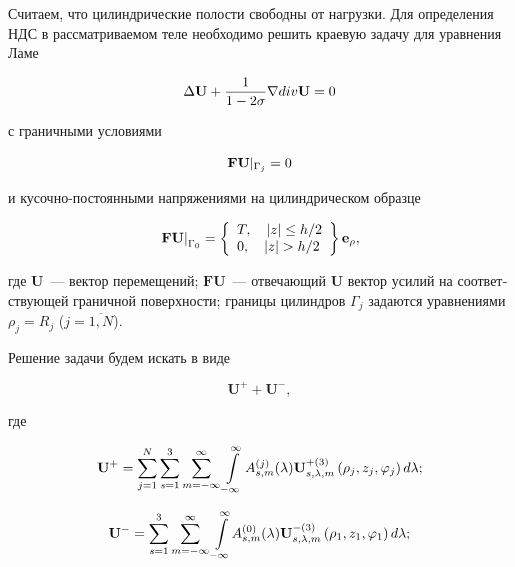 \begin{russian}
Считаем, что цилиндрические полости свободны от нагрузки. Для определения НДС в рассматриваемом теле необходимо решить краевую задачу для уравнения Ламе

\begin{equation}
\Delta {\bf{U}} + \frac{1}{{1 - 2\sigma }}\nabla div{\bf{U}} = 0
\label{eq:7:27}
\end{equation}

\noindent с граничными условиями

\begin{equation}
{\bf{FU}}{|_{{\Gamma _j}}} = 0
\label{eq:7:18}
\end{equation}

\noindent и кусочно-постоянными напряжениями на цилиндрическом образце

\begin{equation}
{\left. {{\bf{FU}}} \right|_{{\Gamma _0}}} = \left\{ \begin{array}{l}
T,\;\;\;{\mkern 1mu} {\kern 1pt} |z| \le h/2\\
0,\;\;\;{\mkern 1mu} {\kern 1pt} |z| > h/2
\end{array} \right\}{{\bf{e}}_\rho },
\label{eq:7:19}
\end{equation}

\noindent где $\mathbf{U}$~--- вектор перемещений; $\mathbf{FU}$~--- отвечающий $\mathbf{U}$ вектор усилий на соответствующей граничной поверхности; границы цилиндров $\Gamma_j$ задаются уравнениями $\rho_j=R_j$ ($j=\overline{1,N}$).

Решение задачи будем искать в виде

\begin{equation}
\mathbf{U}^++\mathbf{U}^-,
\end{equation}

\noindent где

\begin{equation}
{\bf{U}}^+ = \sum\limits_{j = 1}^N {\sum\limits_{s = 1}^3 {\sum\limits_{m =  - \infty }^\infty  {\int\limits_{ - \infty }^\infty  {A_{s,m}^{(j)}} } } } (\lambda ){\bf{U}}_{s,\lambda ,m}^{ + (3)}\left( {{\rho _j},{z_j},{\varphi _j}} \right)d\lambda;
\end{equation}

\begin{equation}
{{\bf{U}}}^- = \sum\limits_{s = 1}^3 {\sum\limits_{m =  - \infty }^\infty  {\mathop \int \limits_{ - \infty }^\infty  } } A_{s,m}^{(0)}(\lambda ){\bf{U}}_{s,\lambda ,m}^{ - (3)}\left( {{\rho _1},{z_1},{\varphi _1}} \right)d\lambda;
\end{equation}


\end{russian}
